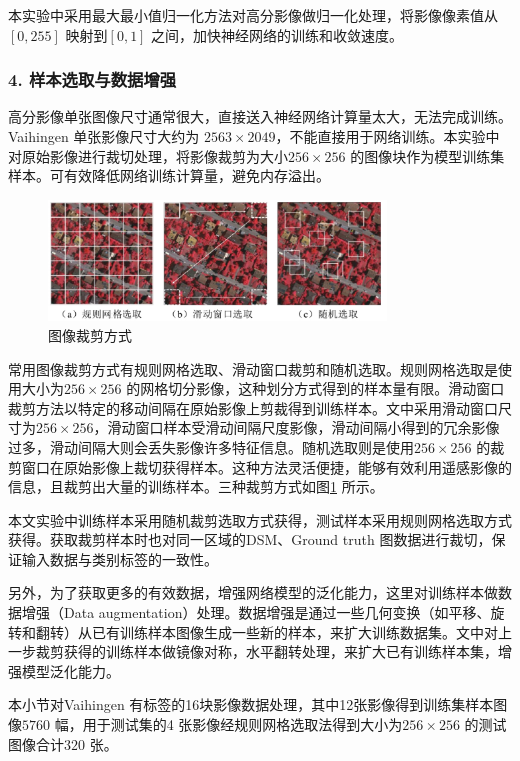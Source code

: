 本实验中采用最大最小值归一化方法对高分影像做归一化处理，将影像像素值从$[0,255]$ 映射到$[0,1]$ 之间，加快神经网络的训练和收敛速度。

\subsubsection*{4. 样本选取与数据增强}
高分影像单张图像尺寸通常很大，直接送入神经网络计算量太大，无法完成训练。Vaihingen 单张影像尺寸大约为 $2563 \times 2049$，不能直接用于网络训练。本实验中对原始影像进行裁切处理，将影像裁剪为大小$256 \times 256$ 的图像块作为模型训练集样本。可有效降低网络训练计算量，避免内存溢出。

\begin{figure}[!htbp]
  \centering
  \includegraphics[width=0.8\textwidth]{figures/sample_data}
  \caption{图像裁剪方式}\label{fig:sample_data}
\end{figure}

常用图像裁剪方式有规则网格选取、滑动窗口裁剪和随机选取。规则网格选取是使用大小为$256 \times 256$ 的网格切分影像，这种划分方式得到的样本量有限。滑动窗口裁剪方法以特定的移动间隔在原始影像上剪裁得到训练样本。文中采用滑动窗口尺寸为$256 \times 256$，滑动窗口样本受滑动间隔尺度影像，滑动间隔小得到的冗余影像过多，滑动间隔大则会丢失影像许多特征信息。随机选取则是使用$256 \times 256$ 的裁剪窗口在原始影像上裁切获得样本。这种方法灵活便捷，能够有效利用遥感影像的信息，且裁剪出大量的训练样本。三种裁剪方式如图\ref{fig:sample_data} 所示。

本文实验中训练样本采用随机裁剪选取方式获得，测试样本采用规则网格选取方式获得。获取裁剪样本时也对同一区域的DSM、Ground truth 图数据进行裁切，保证输入数据与类别标签的一致性。

另外，为了获取更多的有效数据，增强网络模型的泛化能力，这里对训练样本做数据增强（Data augmentation）处理。数据增强是通过一些几何变换（如平移、旋转和翻转）从已有训练样本图像生成一些新的样本，来扩大训练数据集。文中对上一步裁剪获得的训练样本做镜像对称，水平翻转处理，来扩大已有训练样本集，增强模型泛化能力。

本小节对Vaihingen 有标签的16块影像数据处理，其中12张影像得到训练集样本图像$5760$ 幅，用于测试集的4 张影像经规则网格选取法得到大小为$256 \times 256$ 的测试图像合计$320$ 张。




